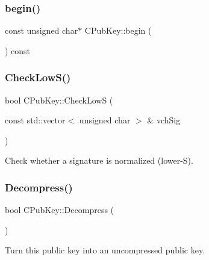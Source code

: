 \subsubsection{\texorpdfstring{begin()}{begin()}}
{\footnotesize\ttfamily const unsigned char$\ast$ C\+Pub\+Key\+::begin (\begin{DoxyParamCaption}{ }\end{DoxyParamCaption}) const\hspace{0.3cm}{\ttfamily [inline]}}

\mbox{\label{class_c_pub_key_a4ada230ef593456ef9088c28fd5ca34e}} 
\subsubsection{\texorpdfstring{Check\+Low\+S()}{CheckLowS()}}
{\footnotesize\ttfamily bool C\+Pub\+Key\+::\+Check\+LowS (\begin{DoxyParamCaption}\item[{const std\+::vector$<$ unsigned char $>$ \&}]{vch\+Sig }\end{DoxyParamCaption})\hspace{0.3cm}{\ttfamily [static]}}

Check whether a signature is normalized (lower-\/S). \mbox{\label{class_c_pub_key_a572689418fecf47b300a11519bc3da36}} 
\subsubsection{\texorpdfstring{Decompress()}{Decompress()}}
{\footnotesize\ttfamily bool C\+Pub\+Key\+::\+Decompress (\begin{DoxyParamCaption}{ }\end{DoxyParamCaption})}



Turn this public key into an uncompressed public key. 

\mbox{\label{class_c_pub_key_ac28722f47ab8a613bf9982608d13aa1f}} 
